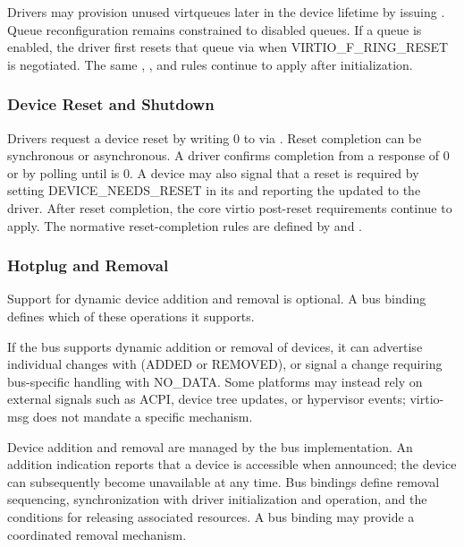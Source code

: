 Drivers may provision unused virtqueues later in the device lifetime by issuing
. Queue reconfiguration remains constrained to disabled
queues. If a queue is enabled, the driver first resets that queue via
 when VIRTIO\_F\_RING\_RESET is negotiated. The same
, , and  rules
continue to apply after initialization.

\subsubsection{Device Reset and Shutdown}
\label{sec:Virtio Transport Options / Virtio Over Messages / Device Operation / Reset}

Drivers request a device reset by writing 0 to  via
. Reset completion can be synchronous or
asynchronous. A driver confirms completion from a
 response  of 0 or by polling
 until  is 0. A device may also signal
that a reset is required by setting DEVICE\_NEEDS\_RESET in its
 and reporting the updated  to the driver. After
reset completion, the core virtio post-reset requirements continue to apply.
The normative reset-completion rules are defined by
 and .

\subsubsection{Hotplug and Removal}
\label{sec:Virtio Transport Options / Virtio Over Messages / Device Operation / Hotplug and Removal}

Support for dynamic device addition and removal is optional. A bus binding
defines which of these operations it supports.

If the bus supports dynamic addition or removal of devices, it can advertise
individual changes with  (ADDED or REMOVED), or signal a
change requiring bus-specific handling with NO\_DATA. Some platforms may
instead rely on external signals such as ACPI, device tree updates, or
hypervisor events; virtio-msg does not mandate a specific mechanism.

Device addition and removal are managed by the bus implementation. An addition
indication reports that a device is accessible when announced; the device can
subsequently become unavailable at any time. Bus bindings define removal
sequencing, synchronization with driver initialization and operation, and the
conditions for releasing associated resources. A bus binding may provide a
coordinated removal mechanism.

